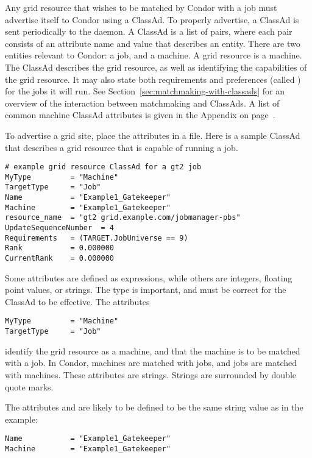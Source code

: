 Any grid resource that wishes to be matched by Condor with
a job must advertise itself to Condor using a ClassAd.
To properly advertise, a ClassAd is sent
periodically to the  daemon.
A ClassAd is a list of pairs, where each pair consists of
an attribute name and value that describes an entity.
There are two entities relevant to Condor:
a job, and a machine.
A grid resource is a machine.
The ClassAd describes the grid resource, as well
as identifying the capabilities of the grid resource.
It may also state both requirements and preferences
(called ) for the jobs it will run.
See
Section~\ref{sec:matchmaking-with-classads} for an overview
of the interaction between matchmaking and ClassAds.
A list of common machine ClassAd attributes is given in
the Appendix on page~\pageref{sec:Machine-ClassAd-Attributes}.

To advertise a grid site, place the attributes
in a file.
Here is a sample ClassAd that describes a grid resource
that is capable of running a
 job.

\footnotesize
\begin{verbatim}
# example grid resource ClassAd for a gt2 job
MyType         = "Machine"
TargetType     = "Job"
Name           = "Example1_Gatekeeper"
Machine        = "Example1_Gatekeeper"
resource_name  = "gt2 grid.example.com/jobmanager-pbs"
UpdateSequenceNumber  = 4
Requirements   = (TARGET.JobUniverse == 9)
Rank           = 0.000000
CurrentRank    = 0.000000
\end{verbatim}
\normalsize


Some attributes are defined as expressions, while
others are integers, floating point values, or strings.
The type is important, and must be correct for the
ClassAd to be effective.
The attributes
\begin{verbatim}
MyType         = "Machine"
TargetType     = "Job"
\end{verbatim}
identify the grid resource as a machine,
and that the machine is to be matched with a job.
In Condor, machines are matched with jobs, and jobs are matched with
machines.
These attributes are strings.
Strings are surrounded by double quote marks.

The attributes  and 
are likely to be defined to be the same string value as in the
example:
\footnotesize
\begin{verbatim}
Name           = "Example1_Gatekeeper"
Machine        = "Example1_Gatekeeper"
\end{verbatim}
\normalsize


